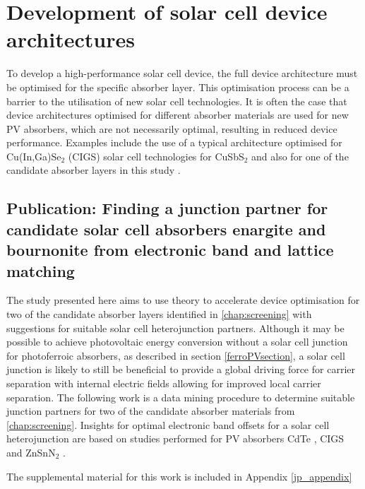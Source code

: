 \documentclass[11pt, twoside]{report}
\begin{document}

\section{Development of solar cell device architectures}
To develop a high-performance solar cell device, the full device architecture must be optimised for the specific absorber layer. This optimisation process can be a barrier to the utilisation of new solar cell technologies. It is often the case that device architectures optimised for different absorber materials are used for new PV absorbers, which are not necessarily optimal, resulting in reduced device performance. Examples include the use of a typical architecture optimised for Cu(In,Ga)Se$_2$ (CIGS) solar cell technologies for CuSbS$_2$ \cite{CAS_alignment} and also for one of the candidate absorber layers in this study {\enargite} \cite{enargite_SC}.


\subsection{Publication: Finding a junction partner for candidate solar cell absorbers enargite and bournonite from electronic band and lattice matching}\label{sulfosalt_band_alignment}

 The study presented here aims to use theory to accelerate device optimisation for two of the candidate absorber layers identified in \autoref{chap:screening} with suggestions for suitable solar cell heterojunction partners. 
Although it may be possible to achieve photovoltaic energy conversion without a solar cell junction for photoferroic absorbers, as described in section \ref{ferroPVsection}, a solar cell junction is likely to still be beneficial to provide a global driving force for carrier separation with internal electric fields allowing for improved local carrier separation. The following work is a data mining procedure to determine suitable junction partners for two of the candidate absorber materials from \autoref{chap:screening}. Insights for optimal electronic band offsets for a solar cell heterojunction are based on studies performed for PV absorbers CdTe \cite{CdTe_spike}, CIGS \cite{p-type_spike} and ZnSnN$_2$ \cite{Elisabetta}.

The supplemental material for this work is included in Appendix \ref{jp_appendix}
\end{document}
